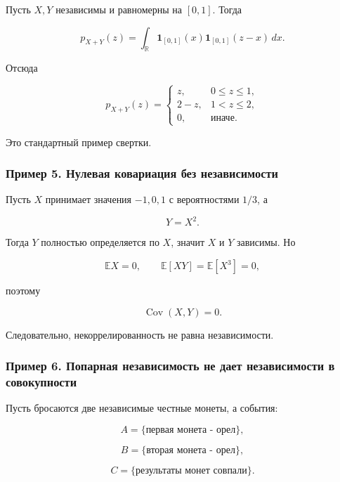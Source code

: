 \documentclass[
  11pt,
  a4paper,
]{article}
\begin{document}
Пусть \(X,Y\) независимы и равномерны на \([0,1]\). Тогда

\[
p_{X+Y}(z)
=
\int_{\mathbb R}\mathbf 1_{[0,1]}(x)\mathbf 1_{[0,1]}(z-x)\,dx.
\]

Отсюда

\[
p_{X+Y}(z)=
\begin{cases}
z, & 0\le z\le1,\\
2-z, & 1<z\le2,\\
0, & \text{иначе}.
\end{cases}
\]

Это стандартный пример свертки.

\subsubsection{Пример 5. Нулевая ковариация без
независимости}\label{ux43fux440ux438ux43cux435ux440-5.-ux43dux443ux43bux435ux432ux430ux44f-ux43aux43eux432ux430ux440ux438ux430ux446ux438ux44f-ux431ux435ux437-ux43dux435ux437ux430ux432ux438ux441ux438ux43cux43eux441ux442ux438}

Пусть \(X\) принимает значения \(-1,0,1\) с вероятностями \(1/3\), а

\[
Y=X^2.
\]

Тогда \(Y\) полностью определяется по \(X\), значит \(X\) и \(Y\)
зависимы. Но

\[
\mathbb EX=0,\qquad
\mathbb E[XY]=\mathbb E[X^3]=0,
\]

поэтому

\[
\operatorname{Cov}(X,Y)=0.
\]

Следовательно, некоррелированность не равна независимости.

\subsubsection{Пример 6. Попарная независимость не дает независимости в
совокупности}\label{ux43fux440ux438ux43cux435ux440-6.-ux43fux43eux43fux430ux440ux43dux430ux44f-ux43dux435ux437ux430ux432ux438ux441ux438ux43cux43eux441ux442ux44c-ux43dux435-ux434ux430ux435ux442-ux43dux435ux437ux430ux432ux438ux441ux438ux43cux43eux441ux442ux438-ux432-ux441ux43eux432ux43eux43aux443ux43fux43dux43eux441ux442ux438}

Пусть бросаются две независимые честные монеты, а события:

\[
A=\{\text{первая монета - орел}\},
\]

\[
B=\{\text{вторая монета - орел}\},
\]

\[
C=\{\text{результаты монет совпали}\}.
\]
\end{document}
